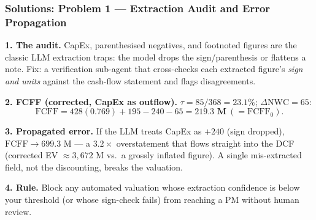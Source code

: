 \documentclass[9pt,t]{beamer}
\begin{document}
\begin{frame}
\frametitle{Solutions: Problem 1 --- Extraction Audit and Error Propagation}

\textbf{1. The audit.} CapEx, parenthesised negatives, and footnoted figures are the
classic LLM extraction traps: the model drops the sign/parenthesis or flattens a note.
Fix: a verification sub-agent that cross-checks each extracted figure's \emph{sign and
units} against the cash-flow statement and flags disagreements.

\medskip
\textbf{2. FCFF (corrected, CapEx as outflow).} $\tau = 85/368 = 23.1\%$;
$\Delta\text{NWC}=65$:
\[ \text{FCFF} = 428(0.769) + 195 - 240 - 65 = \mathbf{219.3\text{ M}}\ (=\text{FCFF}_0). \]

\medskip
\textbf{3. Propagated error.} If the LLM treats CapEx as $+240$ (sign dropped),
$\text{FCFF}\to 699.3$ M --- a $\mathbf{3.2\times}$ overstatement that flows straight
into the DCF (corrected EV $\approx 3{,}672$ M vs.\ a grossly inflated figure). A single
mis-extracted field, not the discounting, breaks the valuation.

\medskip
\textbf{4. Rule.} Block any automated valuation whose extraction confidence is below your
threshold (or whose sign-check fails) from reaching a PM without human review.
\end{frame}
\end{document}
